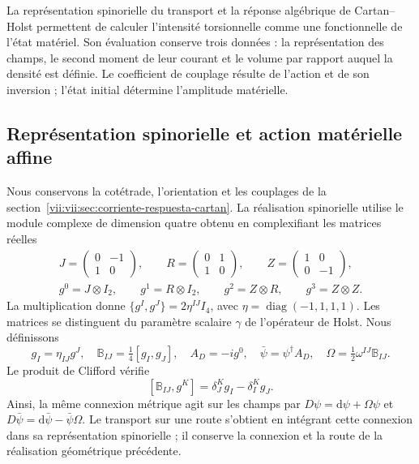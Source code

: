 La représentation spinorielle du transport et la réponse algébrique de Cartan--Holst permettent de calculer l'intensité torsionnelle comme une fonctionnelle de l'état matériel. Son évaluation conserve trois données : la représentation des champs, le second moment de leur courant et le volume par rapport auquel la densité est définie. Le coefficient de couplage résulte de l'action et de son inversion ; l'état initial détermine l'amplitude matérielle.

\subsection{Représentation spinorielle et action matérielle affine}
\label{vii:vii:subsec:accion-espinorial-afin}

Nous conservons la cotétrade, l'orientation et les couplages de la
section~\ref{vii:vii:sec:corriente-respuesta-cartan}. La réalisation
spinorielle utilise le module complexe de dimension quatre obtenu en
complexifiant les matrices réelles
\begin{equation}
 \begin{gathered}
 J=\begin{pmatrix}0&-1\\1&0\end{pmatrix},\qquad
 R=\begin{pmatrix}0&1\\1&0\end{pmatrix},\qquad
 Z=\begin{pmatrix}1&0\\0&-1\end{pmatrix},\\
 g^0=J\otimes I_2,\qquad g^1=R\otimes I_2,\qquad
 g^2=Z\otimes R,\qquad g^3=Z\otimes Z.
 \end{gathered}
 \label{vii:vii:eq:clifford-material-explicito}
\end{equation}
La multiplication donne
\(\{g^I,g^J\}=2\eta^{IJ}I_4\), avec
\(\eta=\operatorname{diag}(-1,1,1,1)\). Les matrices se distinguent
du paramètre scalaire \(\gamma\) de l'opérateur de Holst. Nous définissons
\begin{equation}
 g_I=\eta_{IJ}g^J,\quad
 \mathbb B_{IJ}=\tfrac14[g_I,g_J],\quad
 A_D=-i g^0,\quad \bar\psi=\psi^\dagger A_D,\quad
 \Omega=\tfrac12\omega^{IJ}\mathbb B_{IJ}.
 \label{vii:vii:eq:adjunto-conexion-espinorial}
\end{equation}
Le produit de Clifford vérifie
\[
 [\mathbb B_{IJ},g^K]=\delta_J^K g_I-\delta_I^K g_J.
\]
Ainsi, la même connexion métrique agit sur les champs par
\(D\psi=\mathrm d\psi+\Omega\psi\) et
\(D\bar\psi=\mathrm d\bar\psi-\bar\psi\Omega\).
Le transport sur une route s'obtient en intégrant cette connexion dans
sa représentation spinorielle ; il conserve la connexion et la route de la
réalisation géométrique précédente.

